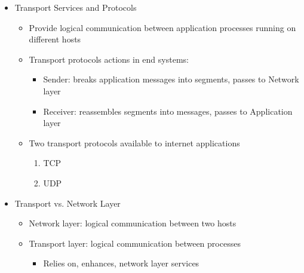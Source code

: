\begin{itemize}

  \item Transport Services and Protocols

    \begin{itemize}

      \item Provide logical communication between application processes running on different hosts

      \item Transport protocols actions in end systems:

        \begin{itemize}

          \item Sender: breaks application messages into segments, passes to Network layer

          \item Receiver: reassembles segments into messages, passes to Application layer

        \end{itemize}

      \item Two transport protocols available to internet applications

        \begin{enumerate}

          \item TCP

          \item UDP

        \end{enumerate}

    \end{itemize}

  \item Transport vs. Network Layer

    \begin{itemize}

      \item Network layer: logical communication between two hosts

      \item Transport layer: logical communication between processes

        \begin{itemize}

          \item Relies on, enhances, network layer services


\end{itemize}
\end{itemize}
\end{itemize}
